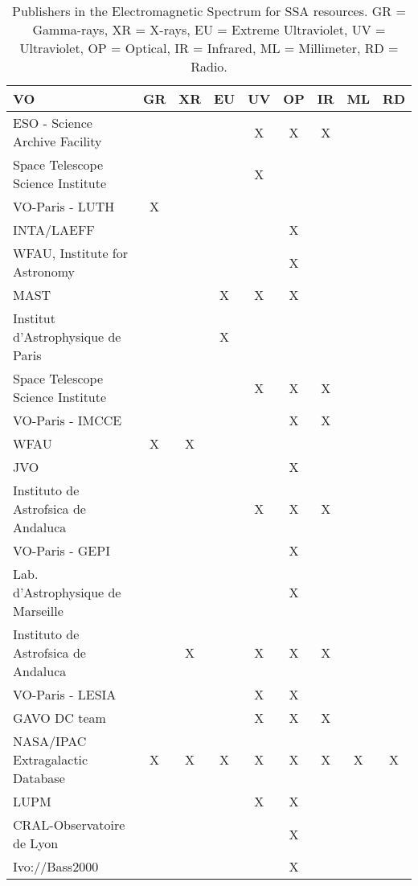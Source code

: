\begin{table}
\begin{center}
\scriptsize
\begin{tabular}{|l|c|c|c|c|c|c|c|c|}
\hline
\textbf{VO} & GR & XR & EU & UV & OP & IR & ML & RD \\
\hline
\hline
  ESO - Science Archive Facility  & & & & X & X & X & & \\
\hline
  Space Telescope Science Institute & & & & X & & & & \\
\hline
  VO-Paris - LUTH & X & & & & & & & \\
\hline
  INTA/LAEFF & & & & & X & & & \\
\hline
  WFAU, Institute for Astronomy & & & & & X & & & \\
\hline
  MAST & & & X & X & X & & & \\
\hline
  Institut d'Astrophysique de Paris & & & X & & & & & \\
\hline
  Space Telescope Science Institute & & & & X & X & X & & \\
\hline
  VO-Paris - IMCCE & & & & & X & X & & \\
\hline
  WFAU & X & X & & & & & & \\
\hline
  JVO & & & & & X & & & \\
\hline
  Instituto de Astrofsica de Andaluca & & & & X & X & X & & \\
\hline
  VO-Paris - GEPI  & & & & & X & & & \\
\hline
  Lab. d'Astrophysique de Marseille & & & & & X & & & \\
\hline
  Instituto de Astrofsica de Andaluca & & X & & X & X & X & & \\
\hline
  VO-Paris - LESIA & & & & X & X & & & \\
\hline
  GAVO DC team  & & & & X & X & X & & \\
\hline
  NASA/IPAC Extragalactic Database & X & X & X & X & X & X & X & X \\
\hline
  LUPM & & & & X & X & & & \\
\hline
  CRAL-Observatoire de Lyon & & & & & X & & & \\
\hline
  Ivo://Bass2000 & & & & & X & & & \\
\hline
\end{tabular}
\caption{Publishers in the Electromagnetic Spectrum for SSA resources.
GR = Gamma-rays, XR = X-rays, EU = Extreme Ultraviolet, UV = Ultraviolet, OP
= Optical, IR = Infrared, ML = Millimeter, RD = Radio.}
\label{tab:SSAEMS}
\end{center}
\end{table}

